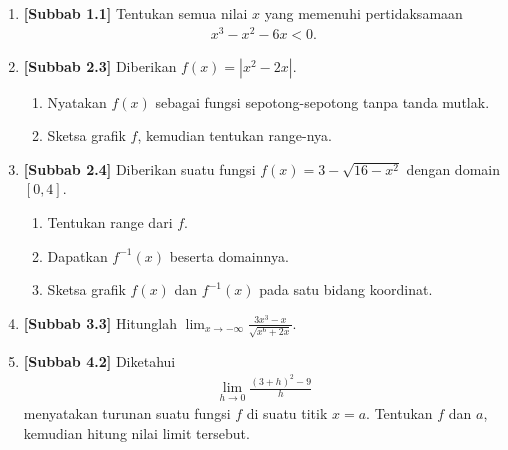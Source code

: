 \documentclass[10pt,openany,a4paper]{article}
\theoremstyle{definition}
\theoremstyle{definition}
\theoremstyle{plain}
\begin{document}
\begin{enumerate}
    \item \textbf{[Subbab 1.1]} Tentukan semua nilai $x$ yang memenuhi pertidaksamaan
    \begin{align*}
        x^3-x^2-6x<0.
    \end{align*}

    \item \textbf{[Subbab 2.3]} Diberikan $f(x)=\left|x^2-2x\right|$.
    \begin{enumerate}
        \item Nyatakan $f(x)$ sebagai fungsi sepotong-sepotong tanpa tanda mutlak.
        \item Sketsa grafik $f$, kemudian tentukan range-nya.
    \end{enumerate}

    \item \textbf{[Subbab 2.4]} Diberikan suatu fungsi $f(x)=3-\sqrt{16-x^2}$ dengan domain $[0,4]$.
    \begin{enumerate}
        \item Tentukan range dari $f$.
        \item Dapatkan $f^{-1}(x)$ beserta domainnya.
        \item Sketsa grafik $f(x)$ dan $f^{-1}(x)$ pada satu bidang koordinat.
    \end{enumerate}

    \item \textbf{[Subbab 3.3]} Hitunglah $\displaystyle\lim_{x\to-\infty}\frac{3x^3-x}{\sqrt{x^6+2x}}$.

    \item \textbf{[Subbab 4.2]} Diketahui
    \begin{align*}
        \lim_{h\to 0}\frac{(3+h)^2-9}{h}
    \end{align*}
    menyatakan turunan suatu fungsi $f$ di suatu titik $x=a$. Tentukan $f$ dan $a$, kemudian hitung nilai limit tersebut.
\end{enumerate}

\newpage
\end{document}
